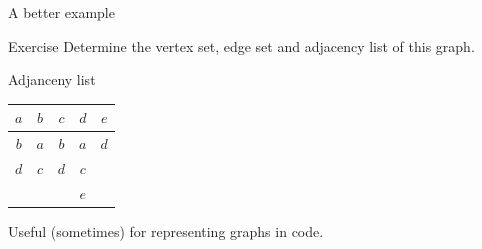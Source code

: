 \documentclass{beamer}
\begin{document}
  
  \begin{frame}{A better example}
    \begin{adjustbox}{max width={0.9\textwidth},center} 
    \end{adjustbox}
    \vspace{0.1cm}
    \begin{block}{Exercise}
    Determine the vertex set, edge set and adjacency list of this graph.
    \end{block}
    
  \end{frame}
  
  \begin{frame}{Adjanceny list}
    \begin{center}
      \begin{tabular}{c@{\hskip 1cm}c@{\hskip 1cm}c@{\hskip 1cm}c@{\hskip 1cm}c}
        $a$ & $b$ & $c$ & $d$ & $e$ \\
        \midrule
        $b$ & $a$ & $b$ & $a$ & $d$ \\
        $d$ & $c$ & $d$ & $c$ &     \\
            &     &     & $e$ &     \\
      \end{tabular}
    \end{center}
    Useful (sometimes) for representing graphs in code.
  \end{frame}
  
\end{document}
